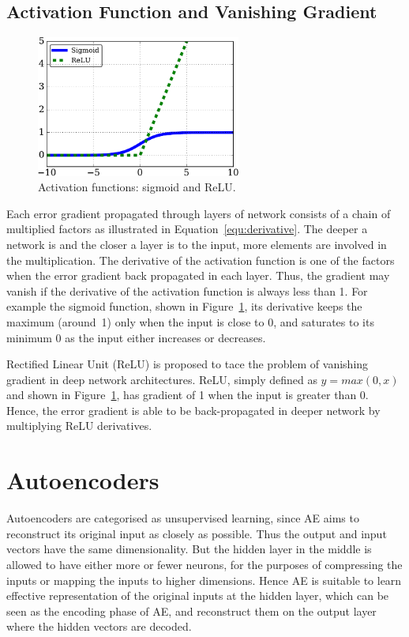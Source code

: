 \subsection{Activation Function and Vanishing Gradient}

\begin{figure}[hbt]
	\centering
	\includegraphics[width=0.6\textwidth]{pics_snn/af.pdf}
	\caption{Activation functions: sigmoid and ReLU.}
	\label{fig:af}
\end{figure}

Each error gradient propagated through layers of network consists of a chain of multiplied factors as illustrated in Equation~\ref{equ:derivative}.
The deeper a network is and the closer a layer is to the input, more elements  are involved in the multiplication.
The derivative of the activation function is one of the factors when the error gradient back propagated in each layer.
Thus, the gradient may vanish if the derivative of the activation function is always less than 1.
For example the sigmoid function, shown in Figure~\ref{fig:af}, its derivative keeps the maximum (around~1) only when the input is close to 0, and saturates to its minimum 0 as the input either increases or decreases.

Rectified Linear Unit (ReLU) is proposed to tace the problem of vanishing gradient in deep network architectures.
ReLU, simply defined as $y = max(0,x)$ and shown in Figure~\ref{fig:af}, has gradient of 1 when the input is greater than 0.
Hence, the error gradient is able to be back-propagated in deeper network by multiplying ReLU derivatives.

\section{Autoencoders}
\label{sec:AE}
Autoencoders are categorised as unsupervised learning, since AE aims to reconstruct its original input as closely as possible.
Thus the output and input vectors have the same dimensionality.
But the hidden layer in the middle is allowed to have either more or fewer neurons, for the purposes of compressing the inputs or mapping the inputs to higher dimensions.
Hence AE is suitable to learn effective representation of the original inputs at the hidden layer, which can be seen as the encoding phase of AE, and reconstruct them on the output layer where the hidden vectors are decoded. 

